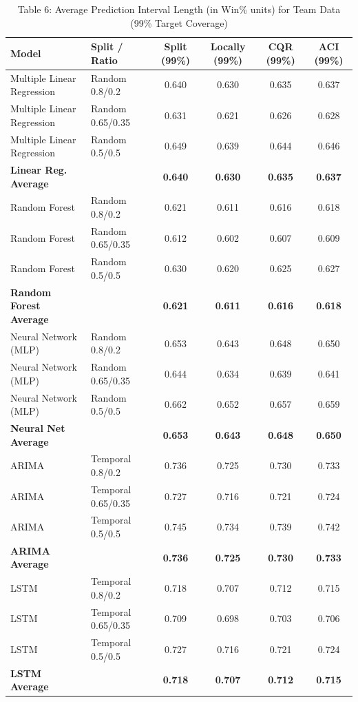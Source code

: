 \documentclass[11pt,a4paper]{article}
\begin{document}
\begin{table}[H]
\centering
\caption{Table 6: Average Prediction Interval Length (in Win\% units) for Team Data (99\% Target Coverage)}
\label{tab:team_tab6}
\scriptsize
\begin{tabular}{llcccc}
\toprule
Model & Split / Ratio & Split (99\%) & Locally (99\%) & CQR (99\%) & ACI (99\%) \\
\midrule
Multiple Linear Regression & Random 0.8/0.2 & 0.640 & 0.630 & 0.635 & 0.637 \\
Multiple Linear Regression & Random 0.65/0.35 & 0.631 & 0.621 & 0.626 & 0.628 \\
Multiple Linear Regression & Random 0.5/0.5 & 0.649 & 0.639 & 0.644 & 0.646 \\
\textbf{Linear Reg. Average} & & \textbf{0.640} & \textbf{0.630} & \textbf{0.635} & \textbf{0.637} \\
\midrule
Random Forest & Random 0.8/0.2 & 0.621 & 0.611 & 0.616 & 0.618 \\
Random Forest & Random 0.65/0.35 & 0.612 & 0.602 & 0.607 & 0.609 \\
Random Forest & Random 0.5/0.5 & 0.630 & 0.620 & 0.625 & 0.627 \\
\textbf{Random Forest Average} & & \textbf{0.621} & \textbf{0.611} & \textbf{0.616} & \textbf{0.618} \\
\midrule
Neural Network (MLP) & Random 0.8/0.2 & 0.653 & 0.643 & 0.648 & 0.650 \\
Neural Network (MLP) & Random 0.65/0.35 & 0.644 & 0.634 & 0.639 & 0.641 \\
Neural Network (MLP) & Random 0.5/0.5 & 0.662 & 0.652 & 0.657 & 0.659 \\
\textbf{Neural Net Average} & & \textbf{0.653} & \textbf{0.643} & \textbf{0.648} & \textbf{0.650} \\
\midrule
ARIMA & Temporal 0.8/0.2 & 0.736 & 0.725 & 0.730 & 0.733 \\
ARIMA & Temporal 0.65/0.35 & 0.727 & 0.716 & 0.721 & 0.724 \\
ARIMA & Temporal 0.5/0.5 & 0.745 & 0.734 & 0.739 & 0.742 \\
\textbf{ARIMA Average} & & \textbf{0.736} & \textbf{0.725} & \textbf{0.730} & \textbf{0.733} \\
\midrule
LSTM & Temporal 0.8/0.2 & 0.718 & 0.707 & 0.712 & 0.715 \\
LSTM & Temporal 0.65/0.35 & 0.709 & 0.698 & 0.703 & 0.706 \\
LSTM & Temporal 0.5/0.5 & 0.727 & 0.716 & 0.721 & 0.724 \\
\textbf{LSTM Average} & & \textbf{0.718} & \textbf{0.707} & \textbf{0.712} & \textbf{0.715} \\
\bottomrule
\end{tabular}
\end{table}
\end{document}
